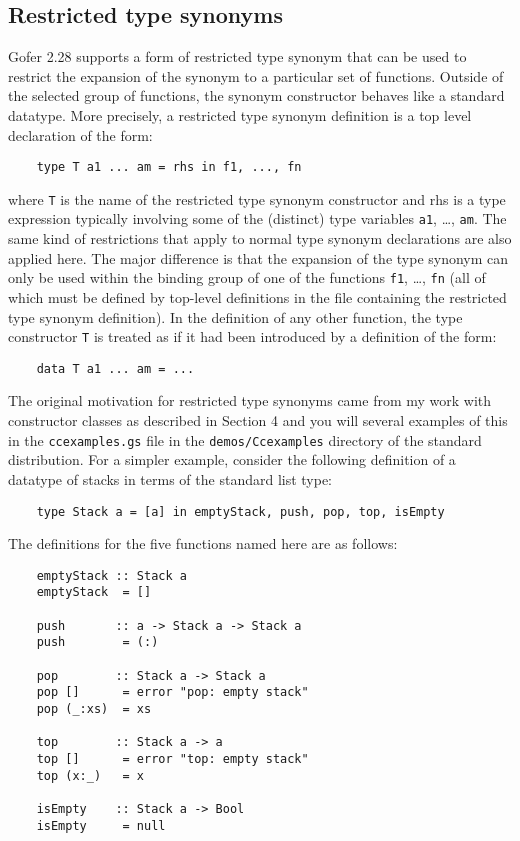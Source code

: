 \subsection{Restricted type synonyms}
Gofer 2.28 supports a form of restricted type synonym that can be used
to restrict the expansion of the synonym to a particular set of
functions.  Outside of the selected group of functions, the synonym
constructor behaves like a standard datatype.  More precisely, a
restricted type synonym definition is a top level declaration of the
form:
\begin{verbatim}
    type T a1 ... am = rhs in f1, ..., fn
\end{verbatim}
where \verb"T" is the name of the restricted type synonym constructor and rhs
is a type expression typically involving some of the (distinct) type
variables \verb"a1", \dots, \verb"am".  The same kind of restrictions that apply to
normal type synonym declarations are also applied here.  The major
difference is that the expansion of the type synonym can only be used
within the binding group of one of the functions \verb"f1", \dots, \verb"fn" (all of
which must be defined by top-level definitions in the file containing
the restricted type synonym definition).  In the definition of any
other function, the type constructor \verb"T" is treated as if it had been
introduced by a definition of the form:
\begin{verbatim}
    data T a1 ... am = ...
\end{verbatim}
The original motivation for restricted type synonyms came from my work
with constructor classes as described in Section 4 and you will several
examples of this in the \verb"ccexamples.gs" file in the \verb"demos/Ccexamples"
directory of the standard distribution.  For a simpler example,
consider the following definition of a datatype of stacks in terms of
the standard list type:
\begin{verbatim}
    type Stack a = [a] in emptyStack, push, pop, top, isEmpty
\end{verbatim}
The definitions for the five functions named here are as follows:
\begin{verbatim}
    emptyStack :: Stack a
    emptyStack  = []

    push       :: a -> Stack a -> Stack a
    push        = (:)

    pop        :: Stack a -> Stack a
    pop []      = error "pop: empty stack"
    pop (_:xs)  = xs

    top        :: Stack a -> a
    top []      = error "top: empty stack"
    top (x:_)   = x

    isEmpty    :: Stack a -> Bool
    isEmpty     = null
\end{verbatim}

